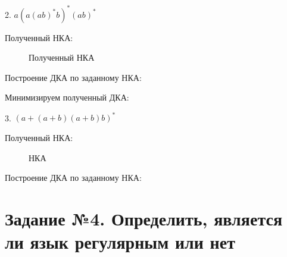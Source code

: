\documentclass{article}
\begin{document}
2. ${a(a{(ab)}^{*}b)}^{*}{(ab)}^{*}$

Полученный НКА:

\begin{figure}[ht!]
{\centering 
\vspace{2ex} 

\caption{Полученный НКА}}
\end{figure}

Построение ДКА по заданному НКА:



Минимизируем полученный ДКА:



3. ${(a+(a+b)(a+b)b)}^{*}$

Полученный НКА:

\begin{figure}[ht!]
{\centering 
\vspace{2ex} 

\caption{НКА}}
\end{figure}

Построение ДКА по заданному НКА:



\section{Задание №4. Определить, является ли язык регулярным или нет}
\end{document}
